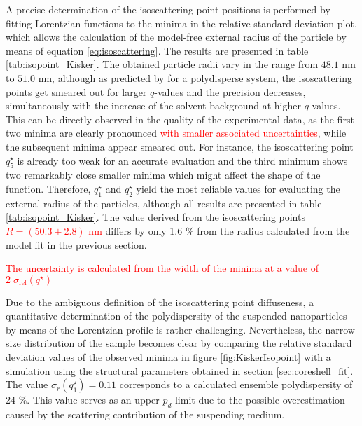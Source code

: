 A precise determination of the isoscattering point positions is performed by fitting Lorentzian functions to the minima in the relative standard deviation plot, which allows the calculation of the model-free external radius of the particle by means of equation \eqref{eq:isoscattering}. The results are presented in table \ref{tab:isopoint_Kisker}. The obtained particle radii vary in the range from \(48.1\) nm to \(51.0\) nm, although as predicted by \cite{kawaguchi_isoscattering_1992} for a polydisperse system, the isoscattering points get smeared out for larger \( q \)-values and the precision decreases, simultaneously with the increase of the solvent background at higher \(q\)-values. This can be directly observed in the quality of the experimental data, as the first two minima are clearly pronounced \textcolor{red}{with smaller associated uncertainties}, while the subsequent minima appear smeared out. For instance, the isoscattering point \(q^{\star}_5\) is already too weak for an accurate evaluation and the third minimum shows two remarkably close smaller minima which might affect the shape of the function. Therefore, \(q^{\star}_1\) and \(q^{\star}_2\) yield the most reliable values for evaluating the external radius of the particles, although all results are presented in table \ref{tab:isopoint_Kisker}. The value derived from the isoscattering points \textcolor{red}{\(R=\left(50.3\pm2.8 \right)\) nm} differs by only 1.6 $\%$ from the radius calculated from the model fit in the previous section.


 \textcolor{red}{The uncertainty is calculated from the width of the minima at a value of $2\; \sigma_{\text{rel}}(q^{\star})$}

Due to the ambiguous definition of the isoscattering point diffuseness, a quantitative determination of the polydispersity of the suspended nanoparticles by means of the Lorentzian profile is rather challenging. Nevertheless, the narrow size distribution of the sample becomes clear by comparing the relative standard deviation values of the observed minima in figure \ref{fig:KiskerIsopoint} with a simulation using the structural parameters obtained in section \ref{sec:coreshell_fit}. The value \( \sigma_r(q^{\star}_1)=0.11 \) corresponds to a calculated ensemble polydispersity of 24 $\%$. This value serves as an upper \( p_d \) limit due to the possible overestimation caused by the scattering contribution of the suspending medium.


